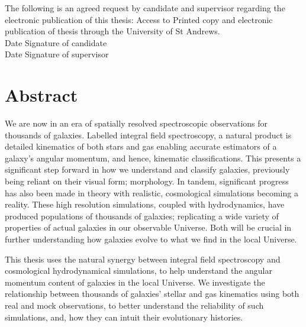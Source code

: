 \documentclass[11pt]{book}
\begin{document}
The following is an agreed request by candidate and supervisor regarding the electronic publication of this thesis: Access to Printed copy and electronic publication of thesis through the University of St Andrews.\\

Date  \hspace{1.8in} Signature of candidate \\

Date  \hspace{1.8in} Signature of supervisor \\


\chapter{Abstract}
We are now in an era of spatially resolved spectroscopic observations for thousands of galaxies. Labelled integral field spectroscopy, a natural product is detailed kinematics of both stars and gas enabling accurate estimators of a galaxy's angular momentum, and hence, kinematic classifications. This presents a significant step forward in how we understand and classify galaxies, previously being reliant on their visual form; morphology. In tandem, significant progress has also been made in theory with realistic, cosmological simulations becoming a reality. These high resolution simulations, coupled with hydrodynamics, have produced populations of thousands of galaxies; replicating a wide variety of properties of actual galaxies in our observable Universe. Both will be crucial in further understanding how galaxies evolve to what we find in the local Universe. 

This thesis uses the natural synergy between integral field spectroscopy and cosmological hydrodynamical simulations, to help understand the angular momentum content of galaxies in the local Universe. We investigate the relationship between thousands of galaxies' stellar and gas kinematics using both real and mock observations, to better understand the reliability of such simulations, and, how they can intuit their evolutionary histories.
\end{document}
